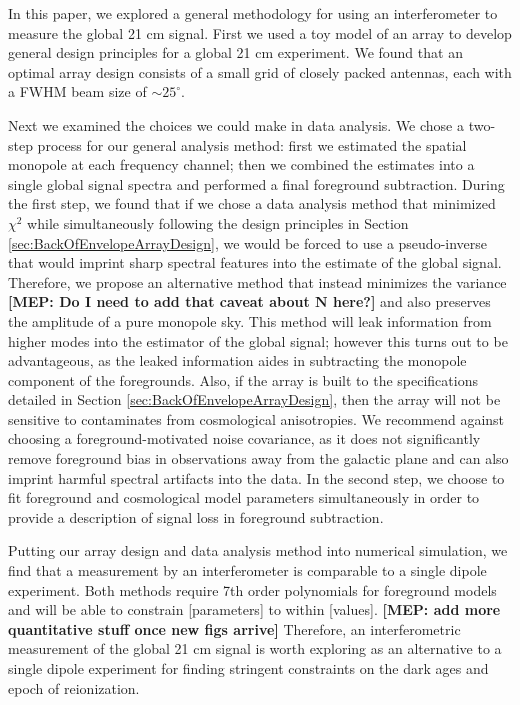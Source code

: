 \documentclass[twolcolumn,apj,iop,numberedappendix]{emulateapj}
\newcommand{\N}{\mathbf{N}}
\newcommand{\mep}[1]{{\color{applegreen} \textbf{[MEP:  #1]}}}
\begin{document}
In this paper, we explored a general methodology for using an interferometer to measure the global 21 cm signal. First we used a toy model of an array to develop general design principles for a global 21 cm experiment. We found that an optimal array design consists of a small grid of closely packed antennas, each with a FWHM beam size of $\sim25^\circ$. 

Next we examined the choices we could make in data analysis. We chose a two-step process for our general analysis method: first we estimated the spatial monopole at each frequency channel; then we combined the estimates into a single global signal spectra and performed a final foreground subtraction. During the first step, we found that if we chose a data analysis method that minimized $\chi^2$ while simultaneously following the design principles in Section \ref{sec:BackOfEnvelopeArrayDesign}, we would be forced to use a pseudo-inverse that would imprint sharp spectral features into the estimate of the global signal. Therefore, we propose an alternative method that instead minimizes the variance \mep{Do I need to add that caveat about $\N$ here?} and also preserves the amplitude of a pure monopole sky. This method will leak information from higher modes into the estimator of the global signal; however this turns out to be advantageous, as the leaked information aides in subtracting the monopole component of the foregrounds. Also, if the array is built to the specifications detailed in Section \ref{sec:BackOfEnvelopeArrayDesign}, then the array will not be sensitive to contaminates from cosmological anisotropies. We recommend against choosing a foreground-motivated noise covariance, as it does not significantly remove foreground bias in observations away from the galactic plane and can also imprint harmful spectral artifacts into the data. In the second step, we choose to fit foreground and cosmological model parameters simultaneously in order to provide a description of signal loss in foreground subtraction. 

Putting our array design and data analysis method into numerical simulation, we find that a measurement by an interferometer is comparable to a single dipole experiment. Both methods require 7th order polynomials for foreground models and will be able to constrain [parameters] to within [values]. \mep{add more quantitative stuff once new figs arrive} Therefore, an interferometric measurement of the global 21 cm signal is worth exploring as an alternative to a single dipole experiment for finding stringent constraints on the dark ages and epoch of reionization. 
\end{document}
